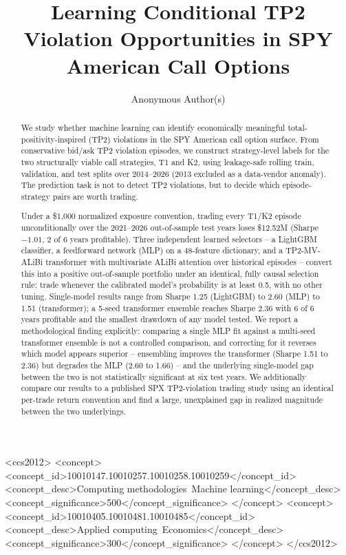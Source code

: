 \documentclass[sigconf,review,anonymous]{acmart}
\begin{document}
\title{Learning Conditional TP2 Violation Opportunities in SPY American Call Options}

\author{Anonymous Author(s)}

\renewcommand{\shortauthors}{Anonymous et al.}

\begin{abstract}
We study whether machine learning can identify economically meaningful total-positivity-inspired (TP2) violations in the SPY American call option surface. From conservative bid/ask TP2 violation episodes, we construct strategy-level labels for the two structurally viable call strategies, T1 and K2, using leakage-safe rolling train, validation, and test splits over 2014--2026 (2013 excluded as a data-vendor anomaly). The prediction task is not to detect TP2 violations, but to decide which episode-strategy pairs are worth trading.

Under a \$1,000 normalized exposure convention, trading every T1/K2 episode unconditionally over the 2021--2026 out-of-sample test years loses \$12.52M (Sharpe $-1.01$, 2 of 6 years profitable). Three independent learned selectors -- a LightGBM classifier, a feedforward network (MLP) on a 48-feature dictionary, and a TP2-MV-ALiBi transformer with multivariate ALiBi attention over historical episodes -- convert this into a positive out-of-sample portfolio under an identical, fully causal selection rule: trade whenever the calibrated model's probability is at least 0.5, with no other tuning. Single-model results range from Sharpe 1.25 (LightGBM) to 2.60 (MLP) to 1.51 (transformer); a 5-seed transformer ensemble reaches Sharpe 2.36 with 6 of 6 years profitable and the smallest drawdown of any model tested. We report a methodological finding explicitly: comparing a single MLP fit against a multi-seed transformer ensemble is not a controlled comparison, and correcting for it reverses which model appears superior -- ensembling improves the transformer (Sharpe 1.51 to 2.36) but degrades the MLP (2.60 to 1.66) -- and the underlying single-model gap between the two is not statistically significant at six test years. We additionally compare our results to a published SPX TP2-violation trading study using an identical per-trade return convention and find a large, unexplained gap in realized magnitude between the two underlyings.
\end{abstract}

\begin{CCSXML}
<ccs2012>
 <concept>
  <concept_id>10010147.10010257.10010258.10010259</concept_id>
  <concept_desc>Computing methodologies~Machine learning</concept_desc>
  <concept_significance>500</concept_significance>
 </concept>
 <concept>
  <concept_id>10010405.10010481.10010485</concept_id>
  <concept_desc>Applied computing~Economics</concept_desc>
  <concept_significance>300</concept_significance>
 </concept>
</ccs2012>
\end{CCSXML}
\end{document}
